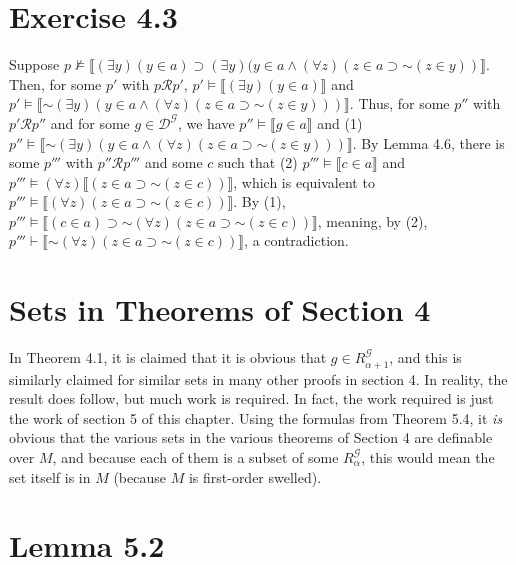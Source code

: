\documentclass{article}
\newcommand*{\oldneg}{\mathord{\sim}}
\newcommand{\lbc}{\llbracket}
\newcommand{\rbc}{\rrbracket}
\theoremstyle{definition}
\begin{document}
\section*{Exercise 4.3}
Suppose $p\nvDash\lbc(\exists y)(y\in a)\supset(\exists y)(y\in a\wedge(\forall z)(z\in a\supset\oldneg(z\in y))\rbc$. 
Then, for some $p'$ with $p\mathcal{R}p'$,
$p'\vDash\lbc(\exists y)(y\in a)\rbc$ and $p'\vDash\lbc\oldneg(\exists y)(y\in a\wedge(\forall z)(z\in a\supset\oldneg(z\in y)))\rbc$.
Thus, for some $p''$ with $p'\mathcal{R}p''$ and for some $g\in\mathcal{D}^\mathcal{G}$, we have
$p''\vDash\lbc g\in a\rbc$ and (1) $p''\vDash\lbc\oldneg(\exists y)(y\in a\wedge(\forall z)(z\in a\supset\oldneg(z\in y)))\rbc$. By Lemma 4.6, 
there is some $p'''$ with $p''\mathcal{R}p'''$ and some $c$ such that 
(2) $p'''\vDash\lbc c\in a\rbc$ and $p'''\vDash(\forall z)\lbc(z\in a\supset\oldneg(z\in c))\rbc$, which is equivalent to
$p'''\vDash\lbc(\forall z)(z\in a\supset\oldneg (z\in c))\rbc$. By (1), 
$p'''\vDash\lbc(c\in a)\supset\oldneg(\forall z)(z\in a\supset\oldneg(z\in c))\rbc$, meaning, by (2), 
$p'''\vdash\lbc\oldneg(\forall z)(z\in a\supset\oldneg(z\in c))\rbc$, a contradiction.

\section*{Sets in Theorems of Section 4}
In Theorem 4.1, it is claimed that it is obvious that $g\in R^\mathcal{G}_{\alpha+1}$, and this is similarly claimed for similar sets in many 
other proofs in section 4. In reality, the result does follow, but much work is required. In fact, the work required is just the work of 
section 5 of this chapter. Using the formulas from Theorem 5.4, it \textit{is} obvious that the various sets in the various theorems of 
Section 4 are definable over $M$, and because each of them is a subset of some $R^\mathcal{G}_\alpha$, this would mean 
the set itself is in $M$ (because $M$ is first-order swelled). 

\section*{Lemma 5.2}
\end{document}
